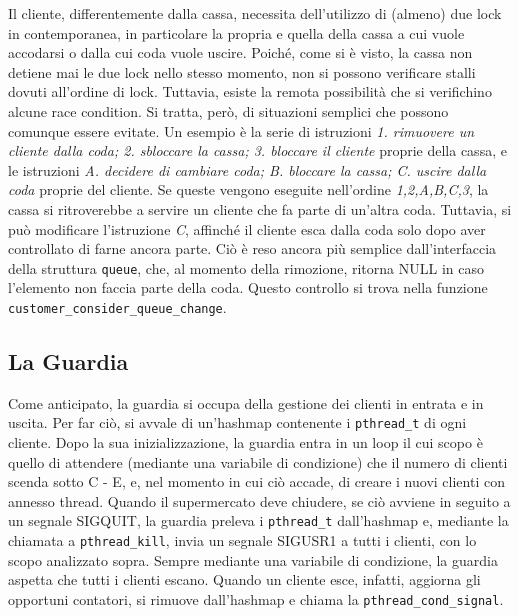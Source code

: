 \documentclass[a4paper,11pt] {article}
\begin{document}
Il cliente, differentemente dalla cassa, necessita dell'utilizzo di (almeno) due lock in contemporanea, in particolare la propria e quella della cassa a cui vuole accodarsi o dalla cui coda vuole uscire. Poiché, come si è visto, la cassa non detiene mai le due lock nello stesso momento, non si possono verificare stalli dovuti all'ordine di lock. Tuttavia, esiste la remota possibilità che si verifichino alcune race condition. Si tratta, però, di situazioni semplici che possono comunque essere evitate. Un esempio è la serie di istruzioni \textit{1. rimuovere un cliente dalla coda; 2. sbloccare la cassa; 3. bloccare il cliente} proprie della cassa, e le istruzioni \textit{A. decidere di cambiare coda; B. bloccare la cassa; C. uscire dalla coda} proprie del cliente. Se queste vengono eseguite nell'ordine \textit{1,2,A,B,C,3}, la cassa si ritroverebbe a servire un cliente che fa parte di un'altra coda. Tuttavia, si può modificare l'istruzione \textit{C}, affinché il cliente esca dalla coda solo dopo aver controllato di farne ancora parte. Ciò è reso ancora più semplice dall'interfaccia della struttura \lstinline{queue}, che, al momento della rimozione, ritorna NULL in caso l'elemento non faccia parte della coda. Questo controllo si trova nella funzione \lstinline{customer_consider_queue_change}.

\subsection*{La Guardia}

Come anticipato, la guardia si occupa della gestione dei clienti in entrata e in uscita. Per far ciò, si avvale di un'hashmap contenente i \lstinline{pthread_t} di ogni cliente. Dopo la sua inizializzazione, la guardia entra in un loop il cui scopo è quello di attendere (mediante una variabile di condizione) che il numero di clienti scenda sotto C - E, e, nel momento in cui ciò accade, di creare i nuovi clienti con annesso thread. Quando il supermercato deve chiudere, se ciò avviene in seguito a un segnale SIGQUIT, la guardia preleva i \lstinline{pthread_t} dall'hashmap e, mediante la chiamata a \lstinline{pthread_kill}, invia un segnale SIGUSR1 a tutti i clienti, con lo scopo analizzato sopra. Sempre mediante una variabile di condizione, la guardia aspetta che tutti i clienti escano. Quando un cliente esce, infatti, aggiorna gli opportuni contatori, si rimuove dall'hashmap e chiama la \lstinline{pthread_cond_signal}.
\end{document}
